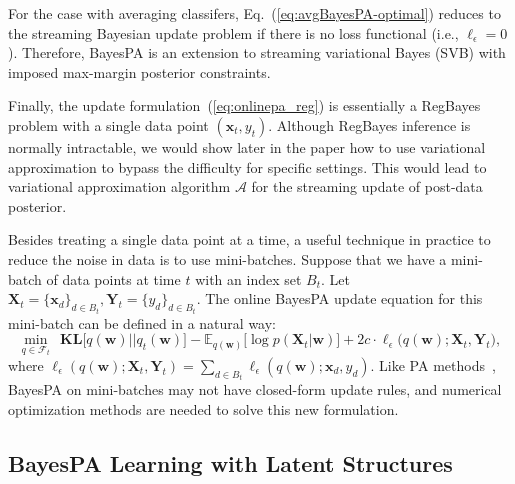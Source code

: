\documentclass[twoside,11pt]{article}
\newcommand{\xv}{\bm{x}}
\newcommand{\Xv}{\bm{X}}
\newcommand{\Yv}{\bm{Y}}
\newcommand{\algo}{\mathcal{A}}
\newcommand{\wv}{\bm{w}}
\newcommand{\KL}{\textbf{KL}}
\begin{document}
For the case with averaging classifers, Eq.~(\ref{eq:avgBayesPA-optimal}) reduces to the streaming Bayesian update problem if there is no loss functional (i.e., $\ell_\epsilon = 0$). Therefore, BayesPA is an extension to streaming variational Bayes (SVB) with imposed max-margin posterior constraints.

Finally, the update formulation~(\ref{eq:onlinepa_reg}) is essentially a RegBayes problem with a single data point $(\xv_t, y_t)$. Although RegBayes inference is normally intractable, we would show later in the paper how to use variational approximation to bypass the difficulty for specific settings. This would lead to variational approximation algorithm $\algo$ for the streaming update of post-data posterior.

Besides treating a single data point at a time, a useful technique in practice to reduce the noise in data is to use mini-batches. Suppose that we have a mini-batch of data points at time $t$ with an index set $B_t$. Let $\Xv_t = \{\xv_d\}_{d \in B_t}, \Yv_t = \{y_{d}\}_{d \in B_t}$. The online BayesPA update equation for this mini-batch can be defined in a natural way:
%
\begin{equation*} %
\underset{q \in \mathcal{F}_t}{\operatorname{min}}{~ ~\KL\Big[q(\bm{w}) || q_{t}(\bm{w}) \Big]-\mathbb{E}_{q(\bm{w})}\Big[\log p(\Xv_t | \bm{w})\Big] + 2c \cdot \ell_\epsilon\Big(q(\wv); \Xv_t, \Yv_t\Big)},
\end{equation*}
%
where $\ell_\epsilon(q(\wv); \Xv_t, \Yv_t) = \sum_{d \in B_t}{\ell_\epsilon(q(\wv); \xv_d, y_d)}$. Like PA methods~\citep{crammer2006pa}, BayesPA on mini-batches may not have closed-form update rules, and numerical optimization methods are needed to solve this new formulation.

\subsection{BayesPA Learning with Latent Structures}\label{sec:pa_latent}
\end{document}
